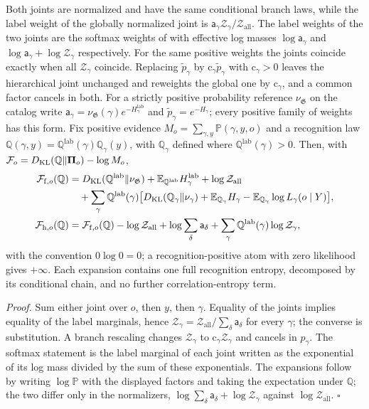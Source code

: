 Both joints are normalized and have the same conditional branch laws, while the label
weight of the globally normalized joint is $\mathsf a_\gamma\mathcal
Z_\gamma/\mathcal Z_{\mathrm{all}}$. The label weights of the two joints are the
softmax weights of  with effective log masses
$\log\mathsf a_\gamma$ and $\log\mathsf a_\gamma+\log\mathcal Z_\gamma$
respectively. For the same positive weights the joints coincide exactly when all
$\mathcal Z_\gamma$ coincide. Replacing $\widetilde p_\gamma$ by $\mathrm
c_\gamma\widetilde p_\gamma$ with $\mathrm c_\gamma>0$ leaves the hierarchical joint
unchanged and reweights the global one by $\mathrm c_\gamma$, and a common factor
cancels in both. For a strictly positive probability reference $\nu_{\mathfrak G}$ on
the catalog write $\mathsf a_\gamma=\nu_{\mathfrak G}(\gamma)e^{-H^{\mathrm{lab}}_\gamma}$ and
$\widetilde p_\gamma=e^{-H_\gamma}$; every positive family of weights has this form.
Fix positive evidence $M_o=\sum_{\gamma,y}\mathbb P(\gamma,y,o)$ and a recognition law
$\mathbb Q(\gamma,y)=\mathbb Q^{\mathrm{lab}}(\gamma)\mathbb Q_\gamma(y)$, with
$\mathbb Q_\gamma$ defined where $\mathbb Q^{\mathrm{lab}}(\gamma)>0$. Then, with
$\mathcal F_o=D_{\mathrm{KL}}(\mathbb Q\Vert\boldsymbol\Pi_o)-\log M_o$,
\begin{align}
\mathcal F_{\mathrm f,o}(\mathbb Q)
&=D_{\mathrm{KL}}(\mathbb Q^{\mathrm{lab}}\Vert\nu_{\mathfrak G})+\mathbb E_{\mathbb Q^{\mathrm{lab}}}H^{\mathrm{lab}}_\gamma
+\log\mathcal Z_{\mathrm{all}}
\nonumber\\
&\quad+\sum_\gamma\mathbb Q^{\mathrm{lab}}(\gamma)
\bigl[D_{\mathrm{KL}}(\mathbb Q_\gamma\Vert\nu_\gamma)+\mathbb E_{\mathbb Q_\gamma}H_\gamma
-\mathbb E_{\mathbb Q_\gamma}\log L_\gamma(o\mid Y)\bigr],
\label{eq:rg-geometry-vfe-f}\\
\mathcal F_{\mathrm h,o}(\mathbb Q)
&=\mathcal F_{\mathrm f,o}(\mathbb Q)-\log\mathcal Z_{\mathrm{all}}
+\log\sum_\delta\mathsf a_\delta
+\sum_\gamma\mathbb Q^{\mathrm{lab}}(\gamma)\log\mathcal Z_\gamma,
\label{eq:rg-geometry-vfe-h}
\end{align}
with the convention $0\log0=0$; a recognition-positive atom with zero likelihood
gives $+\infty$. Each expansion contains one full recognition entropy, decomposed by
its conditional chain, and no further correlation-entropy term.

\noindent\emph{Proof.}
Sum either joint over $o$, then $y$, then $\gamma$. Equality of the joints implies
equality of the label marginals, hence $\mathcal Z_\gamma=\mathcal
Z_{\mathrm{all}}/\sum_\delta\mathsf a_\delta$ for every $\gamma$; the converse is
substitution. A branch rescaling changes $\mathcal Z_\gamma$ to $\mathrm
c_\gamma\mathcal Z_\gamma$ and cancels in $p_\gamma$. The softmax statement is the
label marginal of each joint written as the exponential of its log mass divided by the
sum of these exponentials. The expansions follow by writing $\log\mathbb P$ with the
displayed factors and taking the expectation under $\mathbb Q$; the two differ only in
the normalizers, $\log\sum_\delta\mathsf a_\delta+\log\mathcal Z_\gamma$ against
$\log\mathcal Z_{\mathrm{all}}$. $\square$

